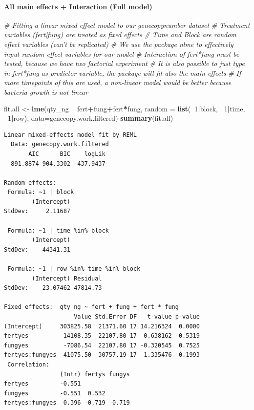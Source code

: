 \documentclass[twoside,12pt,final]{ucthesis-CA2012}
\newenvironment{Shaded}{}{}
\newcommand{\KeywordTok}[1]{\textcolor[rgb]{0.00,0.44,0.13}{\textbf{{#1}}}}
\newcommand{\DataTypeTok}[1]{\textcolor[rgb]{0.56,0.13,0.00}{{#1}}}
\newcommand{\DecValTok}[1]{\textcolor[rgb]{0.25,0.63,0.44}{{#1}}}
\newcommand{\StringTok}[1]{\textcolor[rgb]{0.25,0.44,0.63}{{#1}}}
\newcommand{\CommentTok}[1]{\textcolor[rgb]{0.38,0.63,0.69}{\textit{{#1}}}}
\newcommand{\NormalTok}[1]{{#1}}
\newcommand{\OperatorTok}[1]{\textcolor[rgb]{0.00,0.44,0.13}{\textbf{{#1}}}}
\begin{document}
\begin{ucmainmatter}
{\paragraph{All main effects + Interaction (Full model)}\label{all-main-effects-interaction-full-model}}
\begin{Shaded}
\begin{Highlighting}[]
\CommentTok{# Fitting a linear mixed effect model to our genecopynumber dataset}
  \CommentTok{# Treatment variables (fert|fung) are treated as fixed effects}
  \CommentTok{# Time and Block are random effect variables (can't be replicated)}
  \CommentTok{# We use the package nlme to effectively input random effect variables for our model}
  \CommentTok{# Interaction of fert*fung must be tested, because we have two factorial experiment }
  \CommentTok{# It is also possible to just type in fert*fung as predictor variable, the package will fit also the main effects}
  \CommentTok{# If more timepoints of this are used, a non-linear model would be better because bacteria growth is not linear}
  
\NormalTok{  fit.all <-}\StringTok{ }\KeywordTok{lme}\NormalTok{(qty_ng }\OperatorTok{~}\StringTok{ }\NormalTok{fert}\OperatorTok{+}\NormalTok{fung}\OperatorTok{+}\NormalTok{fert}\OperatorTok{*}\NormalTok{fung,}
                  \DataTypeTok{random =} \KeywordTok{list}\NormalTok{(}\OperatorTok{~}\DecValTok{1}\OperatorTok{|}\NormalTok{block, }\OperatorTok{~}\DecValTok{1}\OperatorTok{|}\NormalTok{time, }\OperatorTok{~}\DecValTok{1}\OperatorTok{|}\NormalTok{row),}
                  \DataTypeTok{data=}\NormalTok{genecopy.work.filtered)}
  \KeywordTok{summary}\NormalTok{(fit.all)}
\end{Highlighting}
\end{Shaded}
\begin{verbatim}
Linear mixed-effects model fit by REML
  Data: genecopy.work.filtered 
       AIC      BIC    logLik
  891.8874 904.3302 -437.9437

Random effects:
 Formula: ~1 | block
        (Intercept)
StdDev:     2.11687

 Formula: ~1 | time %in% block
        (Intercept)
StdDev:    44341.31

 Formula: ~1 | row %in% time %in% block
        (Intercept) Residual
StdDev:    23.07462 47814.73

Fixed effects:  qty_ng ~ fert + fung + fert * fung 
                    Value Std.Error DF   t-value p-value
(Intercept)     303825.58  21371.60 17 14.216324  0.0000
fertyes          14108.35  22107.80 17  0.638162  0.5319
fungyes          -7086.54  22107.80 17 -0.320545  0.7525
fertyes:fungyes  41075.50  30757.19 17  1.335476  0.1993
 Correlation: 
                (Intr) fertys fungys
fertyes         -0.551              
fungyes         -0.551  0.532       
fertyes:fungyes  0.396 -0.719 -0.719


\end{verbatim}
\end{ucmainmatter}
\end{document}
